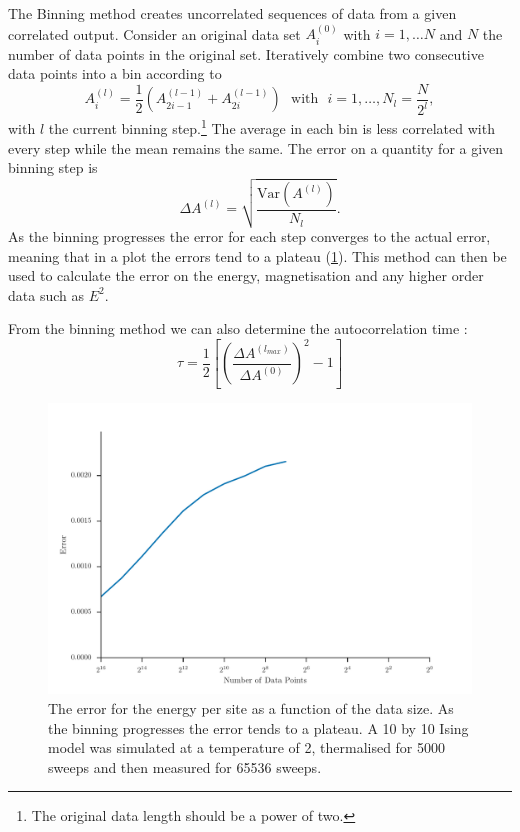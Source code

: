 \documentclass[11pt, a4paper]{report} %
\begin{document}
The Binning method creates uncorrelated sequences of data from a given correlated output.
Consider an original data set \(A_i^{(0)}\) with \(i = 1, \ldots N\) and \(N\) the number of data points in the original set.
Iteratively combine two consecutive data points into a bin according to
\begin{equation}
	A_i^{(l)} = \frac{1}{2} \left(A_{2i-1}^{(l-1)} + A_{2i}^{(l-1)} \right) \mathrm{\ \ \ with \ \ \ } i = 1, \ldots, N_l = \frac{N}{2^l},
\end{equation}
with \(l\) the current binning step.\footnote{The original data length should be a power of two.}
The average in each bin is less correlated with every step while the mean remains the same.
The error on a quantity for a given binning step is
\begin{equation}
	\label{eq:basic_error}
	\Delta A^{(l)} = \sqrt{\frac{\mathrm{Var}(A^{(l)})}{N_l}}.
\end{equation}
As the binning progresses the error for each step converges to the actual error, meaning that in a plot the errors tend to a plateau (\cref{fig:binning_error_convergence}).
This method can then be used to calculate the error on the energy, magnetisation and any higher order data such as \(E^2\).

From the binning method we can also determine the autocorrelation time \cite{corboz}:
\begin{equation}
	\tau = \frac{1}{2} \left[\left( \frac{\Delta A^{(l_{max})}}{\Delta A^{(0)}} \right)^2- 1 \right]
\end{equation}
\begin{figure}[htb]
	\centering
	\includegraphics[width=\textwidth]{ising_metropolis_energy_per_site_error_binning.pdf}
	\caption{The error for the energy per site as a function of the data size. As the binning progresses the error tends to a plateau. A 10 by 10 Ising model was simulated at a temperature of 2, thermalised for 5000 sweeps and then measured for 65536 sweeps.}
	\label{fig:binning_error_convergence}
\end{figure}
\end{document}
